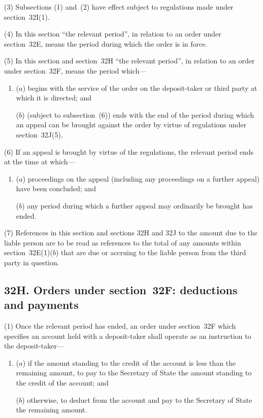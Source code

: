 \documentclass[12pt,a4paper]{article}
\begin{document}
(3)
Subsections (1) and~(2) have effect subject to regulations made under section~32I(1).

(4)
In this section “the relevant period”, in relation to an order under section~32E, means the period during which the order is in force.

(5)
In this section and section~32H “the relevant period”, in relation to an order under section~32F, means the period which---
\begin{enumerate}\item[]
($a$) begins with the service of the order on the deposit-taker or third party at which it is directed; and

($b$) (subject to subsection~(6)) ends with the end of the period during which an appeal can be brought against the order by virtue of regulations under section~32J(5).
\end{enumerate}

(6) If an appeal is brought by virtue of the regulations, the relevant period ends at the time at which---
\begin{enumerate}\item[]
($a$) proceedings on the appeal (including any proceedings on a further appeal) have been concluded; and

($b$) any period during which a further appeal may ordinarily be brought has ended.
\end{enumerate}

(7) References in this section and sections 32H and 32J to the amount due to the liable person are to be read as references to the total of any amounts within section~32E(1)($b$) that are due or accruing to the liable person from the third party in question.

\subsection{32H. Orders under section~32F: deductions and payments}

(1) Once the relevant period has ended, an order under section~32F which specifies an account held with a deposit-taker shall operate as an instruction to the deposit-taker---
\begin{enumerate}\item[]
($a$) if the amount standing to the credit of the account is less than the remaining amount, to pay to the 
Secretary of State  %
the amount standing to the credit of the account; and

($b$) otherwise, to deduct from the account and pay to the 
Secretary of State  %
the remaining amount.
\end{enumerate}
\end{document}
